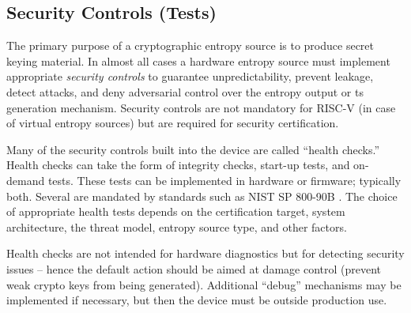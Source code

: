 \subsection{Security Controls (Tests)}
\label{sec:security-controls}

    The primary purpose of a cryptographic entropy source is to produce
    secret keying material. In almost all cases a hardware entropy source
    must implement appropriate \emph{security controls} to guarantee
    unpredictability, prevent leakage, detect attacks, and deny
    adversarial control over the entropy output or ts generation mechanism.
    Security controls are not mandatory for RISC-V (in case of virtual
    entropy sources) but are required for security certification.

    Many of the security controls built into the device are called ``health
    checks.'' Health checks can take the form of integrity checks, start-up
    tests, and on-demand tests. These tests can be implemented in hardware
    or firmware; typically both. Several are mandated by standards such as
    NIST SP 800-90B \cite{NI19}. The choice of appropriate health tests
    depends on the certification target, system architecture, the threat
    model, entropy source type, and other factors.

    Health checks are not intended for hardware diagnostics but for
    detecting security issues -- hence the default action should be aimed
    at damage control (prevent weak crypto keys from being
    generated). Additional ``debug'' mechanisms may be implemented if
    necessary, but then the device must be outside production use.

